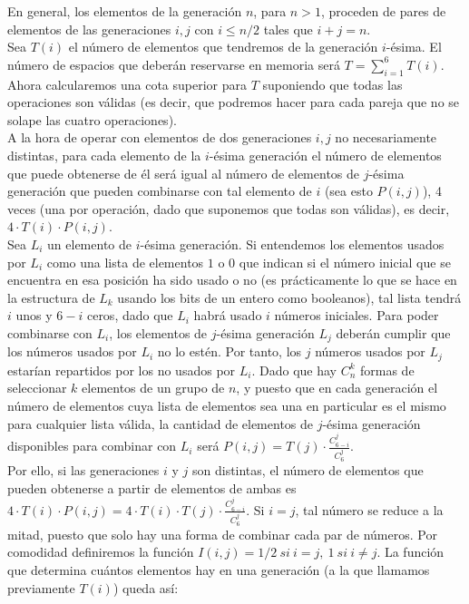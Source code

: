 En general, los elementos de la generación $n$, para $n>1$, proceden de pares de elementos de las generaciones $i,j$ con $i \le n/2$ tales que $i+j=n$.\\

Sea $T(i)$ el número de elementos que tendremos de la generación $i$-ésima. El número de espacios que deberán reservarse en memoria será $T = \displaystyle \sum_{i=1}^6 T(i)$. Ahora calcularemos una cota superior para $T$ suponiendo que todas las operaciones son válidas (es decir, que podremos hacer para cada pareja que no se solape las cuatro operaciones).\\

A la hora de operar con elementos de dos generaciones $i,j$ no necesariamente distintas, para cada elemento de la $i$-ésima generación el número de elementos que puede obtenerse de él será igual al número de elementos de $j$-ésima generación que pueden combinarse con tal elemento de $i$ (sea esto $P(i,j)$), 4 veces (una por operación, dado que suponemos que todas son válidas), es decir, $4 \cdot T(i) \cdot P(i,j)$.\\

Sea $L_i$ un elemento de $i$-ésima generación. Si entendemos los elementos usados por $L_i$ como una lista de elementos $1$ o $0$ que indican si el número inicial que se encuentra en esa posición ha sido usado o no (es prácticamente lo que se hace en la estructura de $L_k$ usando los bits de un entero como booleanos), tal lista tendrá $i$ unos y $6-i$ ceros, dado que $L_i$ habrá usado $i$ números iniciales. Para poder combinarse con $L_i$, los elementos de $j$-ésima generación $L_j$ deberán cumplir que los números usados por $L_i$ no lo estén. Por tanto, los $j$ números usados por $L_j$ estarían repartidos por los no usados por $L_i$. Dado que hay $C_{n}^k$ formas de seleccionar $k$ elementos de un grupo de $n$, y puesto que en cada generación el número de elementos cuya lista de elementos sea una en particular es el mismo para cualquier lista válida, la cantidad de elementos de $j$-ésima generación disponibles para combinar con $L_i$ será $\displaystyle P(i,j) = T(j) \cdot \frac {C_{6-i}^j} {C_6^j}$.\\

Por ello, si las generaciones $i$ y $j$ son distintas, el número de elementos que pueden obtenerse a partir de elementos de ambas es $\displaystyle 4 \cdot T(i) \cdot P(i,j) = 4 \cdot T(i) \cdot T(j) \cdot \frac {C_{6-i}^j} {C_6^j}$. Si $i=j$, tal número se reduce a la mitad, puesto que solo hay una forma de combinar cada par de números. Por comodidad definiremos la función $I(i,j) = 1/2\ si\ i=j,\ 1\ si\ i \ne j$. La función que determina cuántos elementos hay en una generación (a la que llamamos previamente $T(i)$) queda así:

